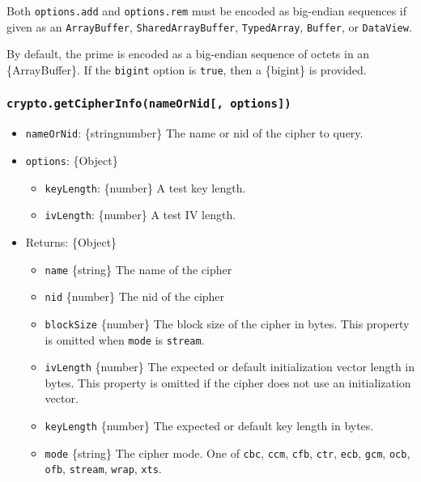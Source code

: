 Both \texttt{options.add} and \texttt{options.rem} must be encoded as
big-endian sequences if given as an \texttt{ArrayBuffer},
\texttt{SharedArrayBuffer}, \texttt{TypedArray}, \texttt{Buffer}, or
\texttt{DataView}.

By default, the prime is encoded as a big-endian sequence of octets in
an \{ArrayBuffer\}. If the \texttt{bigint} option is \texttt{true}, then
a \{bigint\} is provided.

\subsubsection{\texorpdfstring{\texttt{crypto.getCipherInfo(nameOrNid{[},\ options{]})}}{crypto.getCipherInfo(nameOrNid{[}, options{]})}}\label{crypto.getcipherinfonameornid-options}

\begin{itemize}
\tightlist
\item
  \texttt{nameOrNid}: \{string\textbar number\} The name or nid of the
  cipher to query.
\item
  \texttt{options}: \{Object\}

  \begin{itemize}
  \tightlist
  \item
    \texttt{keyLength}: \{number\} A test key length.
  \item
    \texttt{ivLength}: \{number\} A test IV length.
  \end{itemize}
\item
  Returns: \{Object\}

  \begin{itemize}
  \tightlist
  \item
    \texttt{name} \{string\} The name of the cipher
  \item
    \texttt{nid} \{number\} The nid of the cipher
  \item
    \texttt{blockSize} \{number\} The block size of the cipher in bytes.
    This property is omitted when \texttt{mode} is
    \texttt{\textquotesingle{}stream\textquotesingle{}}.
  \item
    \texttt{ivLength} \{number\} The expected or default initialization
    vector length in bytes. This property is omitted if the cipher does
    not use an initialization vector.
  \item
    \texttt{keyLength} \{number\} The expected or default key length in
    bytes.
  \item
    \texttt{mode} \{string\} The cipher mode. One of
    \texttt{\textquotesingle{}cbc\textquotesingle{}},
    \texttt{\textquotesingle{}ccm\textquotesingle{}},
    \texttt{\textquotesingle{}cfb\textquotesingle{}},
    \texttt{\textquotesingle{}ctr\textquotesingle{}},
    \texttt{\textquotesingle{}ecb\textquotesingle{}},
    \texttt{\textquotesingle{}gcm\textquotesingle{}},
    \texttt{\textquotesingle{}ocb\textquotesingle{}},
    \texttt{\textquotesingle{}ofb\textquotesingle{}},
    \texttt{\textquotesingle{}stream\textquotesingle{}},
    \texttt{\textquotesingle{}wrap\textquotesingle{}},
    \texttt{\textquotesingle{}xts\textquotesingle{}}.
  \end{itemize}
\end{itemize}

